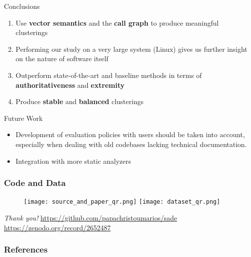 \documentclass{beamer}
\begin{document}
\begin{frame}{Conclusions}

\begin{enumerate}
    \item<1-> Use \textbf{vector semantics} and the \textbf{call graph} to produce meaningful clusterings
    \item<2-> Performing our study on a very large system (Linux) gives us further insight on the nature of software itself
    \item<3-> Outperform state-of-the-art and baseline methods in terms of \textbf{authoritativeness} and \textbf{extremity}
    \item<4-> Produce \textbf{stable} and \textbf{balanced} clusterings 
\end{enumerate}
    
\end{frame}

\begin{frame}{Future Work}

\begin{itemize}
    \item Development of evaluation policies with users should be taken into account, especially when dealing with old codebases lacking technical documentation.
    \item Integration with more static analyzers 
\end{itemize}
    
\end{frame}

\begin{frame}
\frametitle{Code and Data} 

\begin{figure}
\centering
\texttt{[image: source\_and\_paper\_qr.png]} \qquad
\texttt{[image: dataset\_qr.png]}
\end{figure}

\centering \Large {
  \emph{Thank you!}}
  \url{https://github.com/papachristoumarios/sade}
  \url{https://zenodo.org/record/2652487}

\end{frame}


\begin{frame}[allowframebreaks]
\frametitle{References}


\end{frame}
 

 
 
\end{document}
